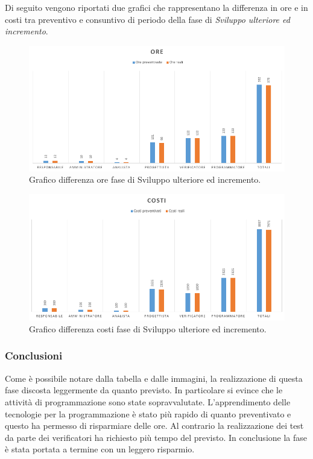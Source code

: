 \documentclass[a4paper]{article}
\begin{document}
				Di seguito vengono riportati due grafici che rappresentano la differenza in ore e in costi tra preventivo e consuntivo di periodo della 
				fase di \emph{Sviluppo ulteriore ed incremento}.
				\begin{figure}[H]
					\centering
					\includegraphics[width=\textwidth]{diff_h_in}
					\caption{Grafico differenza ore fase di Sviluppo ulteriore ed incremento.}
				\end{figure}
				\begin{figure}[H]
					\centering
					\includegraphics[width=\textwidth]{diff_c_in}
					\caption{Grafico differenza costi fase di Sviluppo ulteriore ed incremento.}
				\end{figure}
				
					\subsubsection{Conclusioni}		
						Come è possibile notare dalla tabella e dalle immagini, la realizzazione di questa fase discosta leggermente da quanto previsto. 
						In particolare si evince che le attività di programmazione sono state sopravvalutate. L'apprendimento delle tecnologie per la 
						programmazione è stato più rapido di quanto preventivato e questo ha permesso di risparmiare delle ore.
						Al contrario la realizzazione dei test da parte dei verificatori ha richiesto più tempo del previsto. In conclusione la fase è stata portata a 
						termine con un leggero risparmio.
				
\end{document}
